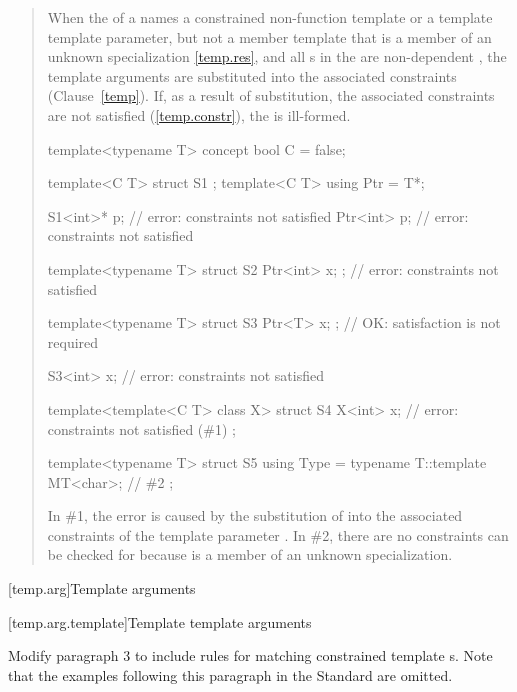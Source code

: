 \begin{quote}
\setcounter{Paras}{7}
\pnum
When the  of a  names
a constrained non-function template or a template template parameter,
but not a member template that is a member of an unknown specialization
\ref{temp.res}, and all s in the
 are non-dependent , the 
template arguments are substituted into the associated constraints
(Clause~\ref{temp}). 
% 
If, as a result of substitution, the associated constraints are not 
satisfied (\ref{temp.constr}), the  is ill-formed.
% 
\enterexample
\begin{codeblock}
template<typename T> concept bool C = false;

template<C T> struct S1 { };
template<C T> using Ptr = T*;

S1<int>* p; // error: constraints not satisfied
Ptr<int> p; // error: constraints not satisfied

template<typename T>
  struct S2 { Ptr<int> x; }; // error: constraints not satisfied

template<typename T>
  struct S3 { Ptr<T> x; };   // OK: satisfaction is not required

S3<int> x;                   // error: constraints not satisfied

template<template<C T> class X>
  struct S4 {
    X<int> x; // error: constraints not satisfied (\#1)
  };

template<typename T>
  struct S5 {
    using Type = typename T::template MT<char>; // \#2
  };
\end{codeblock}
In \#1, the error is caused by the substitution of  into 
the associated constraints of the template parameter .
% 
In \#2, there are no constraints can be checked for 
 because  is a member
of an unknown specialization.
\exitexample
\end{quote}


[temp.arg]{Template arguments}

[temp.arg.template]{Template template arguments}

Modify paragraph 3 to include rules for matching constrained template 
s. Note that the examples following this 
paragraph in the \Cpp Standard are omitted.

